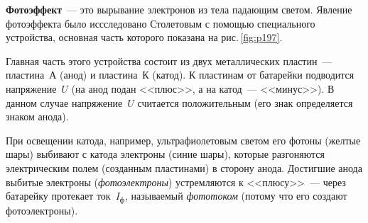 \documentclass[main.tex]{subfiles}
\begin{document}
{%












\textbf{Фотоэффект}~--- это вырывание электронов из тела падающим светом. Явление фотоэффекта было иссследовано Столетовым с помощью специального устройства, основная часть которого показана на рис.\,\ref{fig:p197}. 

Главная часть этого устройства состоит из двух металлических пластин~--- пластина~А (анод) и пластина~К (катод). К пластинам от батарейки подводится напряжение~$U$ (на анод подан <<плюс>>, а на катод~--- <<минус>>). В данном случае напряжение~$U$ считается положительным (его знак определяется знаком анода).

При освещении катода, например, ультрафиолетовым светом его фотоны (желтые шары) выбивают с катода электроны (синие шары), которые разгоняются электрическим полем (созданным пластинами) в сторону анода. Достигшие анода выбитые электроны (\emph{фотоэлектроны}) устремляются к <<плюсу>>~--- через батарейку протекает ток~$I_\text{ф}$, называемый \emph{фототоком} (потому что его создают фотоэлектроны). 


}
\end{document}
